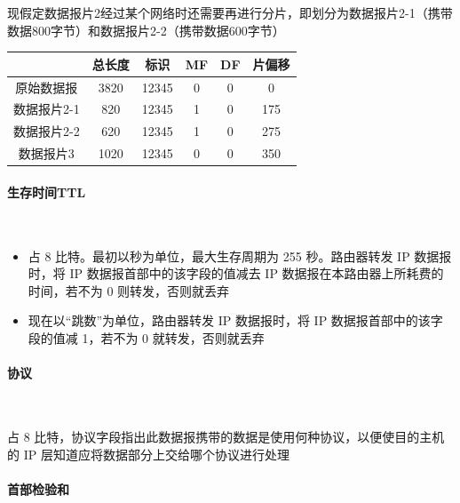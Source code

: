 \documentclass[cs4size,a4paper,10pt]{ctexart}
\begin{document}
	现假定数据报片2经过某个网络时还需要再进行分片，即划分为数据报片2-1（携带数据800字节）和数据报片2-2（携带数据600字节）

	\begin{table}[H]
		\centering
		\begin{tabular}{|c|c|c|c|c|c|}
		\hline
		\textbf{} & 总长度  & 标识    & MF & DF & 片偏移 \\ \hline
		原始数据报     & 3820 & 12345 & 0  & 0  & 0   \\ \hline
		数据报片2-1   & 820  & 12345 & 1  & 0  & 175 \\ \hline
		数据报片2-2   & 620  & 12345 & 1  & 0  & 275 \\ \hline
		数据报片3     & 1020 & 12345 & 0  & 0  & 350 \\ \hline
		\end{tabular}
	\end{table}

	\paragraph{生存时间TTL}~{}

	\begin{itemize}
		\item 占 8 比特。最初以秒为单位，最大生存周期为 255 秒。路由器转发 IP 数据报时，将 IP 数据报首部中的该字段的值减去 IP 数据报在本路由器上所耗费的时间，若不为 0 则转发，否则就丢弃
		\item 现在以“跳数”为单位，路由器转发 IP 数据报时，将 IP 数据报首部中的该字段的值减 1，若不为 0 就转发，否则就丢弃
	\end{itemize}

	\paragraph{协议}~{}

	占 8 比特，协议字段指出此数据报携带的数据是使用何种协议，以便使目的主机的 IP 层知道应将数据部分上交给哪个协议进行处理

	\paragraph{首部检验和}~{}
\end{document}
